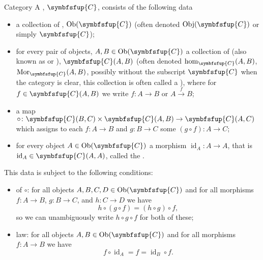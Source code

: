 \documentclass[fleqn]{NotesClass}
\newcommand{\cat}[1]{\symbfsfup{#1}}
\DeclareMathOperator{\Ob}{Ob}
\DeclareMathOperator{\id}{id}
\begin{document}
    \begin{dfn}{Category}{}
        A , \(\cat{C}\), consists of the following data
        \begin{itemize}
            \item a collection of , \(\Ob(\cat{C})\) (often denoted \(\mathop{\operatorname{Obj}}(\cat{C})\) or simply \(\cat{C}\));
            \item for every pair of objects, \(A, B \in \Ob(\cat{C})\) a collection of  (also known as  or ), \(\cat{C}(A, B)\) (often denoted \(\hom_{\cat{C}}(A, B)\), \(\mathop{\operatorname{Mor}}_{\cat{C}}(A, B)\), possibly without the subscript \(\cat{C}\) when the category is clear, this collection is often called a ), where for \(f \in \cat{C}(A, B)\) we write \(f \colon A \to B\) or \(A \xrightarrow{f} B\);
            \item a map \(\circ \colon \cat{C}(B, C) \times \cat{C}(A, B) \to \cat{C}(A, C)\) which assigns to each \(f \colon A \to B\) and \(g \colon B \to C\) some  \((g \circ f) \colon A \to C\);
            \item for every object \(A \in \Ob(\cat{C})\) a morphism \(\id_A \colon A \to A\), that is \(\id_A \in \cat{C}(A, A)\), called the .
        \end{itemize}
        This data is subject to the following conditions:
        \begin{itemize}
            \item {} of \(\circ\): for all objects \(A, B, C, D \in \Ob(\cat{C})\) and for all morphisms \(f \colon A \to B\), \(g \colon B \to C\), and \(h \colon C \to D\) we have
            \begin{equation}
                h \circ (g \circ f) = (h \circ g) \circ f,
            \end{equation}
            so we can unambiguously write \(h \circ g \circ f\) for both of these;
            \item {} law: for all objects \(A, B \in \Ob(\cat{C})\) and for all morphisms \(f \colon A \to B\) we have
            \begin{equation}
                f \circ \id_A = f = \id_B \circ f.
            \end{equation}
        \end{itemize}
    \end{dfn}
    
\end{document}
